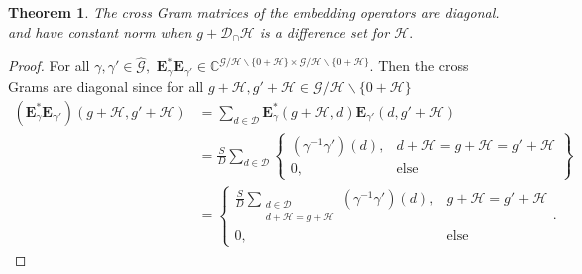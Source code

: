 \documentclass[3p,11pt]{elsarticle}
\newcommand{\bbC}{\mathbb{C}}
\newcommand{\bfE}{\mathbf{E}}
\newcommand{\calD}{\mathcal{D}}
\newcommand{\calG}{\mathcal{G}}
\newcommand{\calH}{\mathcal{H}}
\newtheorem{theorem}{Theorem}[section]
\theoremstyle{definition}
\begin{document}
\begin{theorem}
\label{thm:Embedding Cross Grams diagonal}
The cross Gram matrices of the embedding operators are diagonal. and have constant norm when $g+\calD_\cap\calH$ is a difference set for $\calH.$
\end{theorem}
\begin{proof}
For all $\gamma,\gamma'\in\hat{\calG},$ $\bfE_\gamma^*\bfE_{\gamma'}^{}\in\bbC^{\calG/\calH\backslash\{0+\calH\}\times \calG/\calH\backslash\{0+\calH\}}.$ Then the cross Grams are diagonal since
for all $g+\calH,g'+\calH\in\calG/\calH\backslash\{0+\calH\}$
\begin{align}
(\bfE_\gamma^*\bfE_{\gamma'}^{})(g+\calH,g'
+\calH)&=\sum_{d\in\calD}\bfE_\gamma^*(g+\calH,d)\bfE_{\gamma'}(d,g'+\calH)\nonumber\\
&=\tfrac{S}{D}\sum_{d\in\calD}\left\{\begin{array}{ll}
(\gamma^{-1}\gamma')(d), & d+\calH=g+\calH=g'+\calH\\
0, &\text{else}
\end{array}\right\}\nonumber\\
&=\left\{\begin{array}{ll}
\tfrac{S}{D}\displaystyle\sum_{\substack{d\in\calD\\d+\calH=g+\calH}}(\gamma^{-1}\gamma')(d), &g+\calH=g'+\calH \\\label{eq:Embedding Cross Grams}
0, &\text{else} \end{array}\right..
\end{align}
\end{proof}
\end{document}
